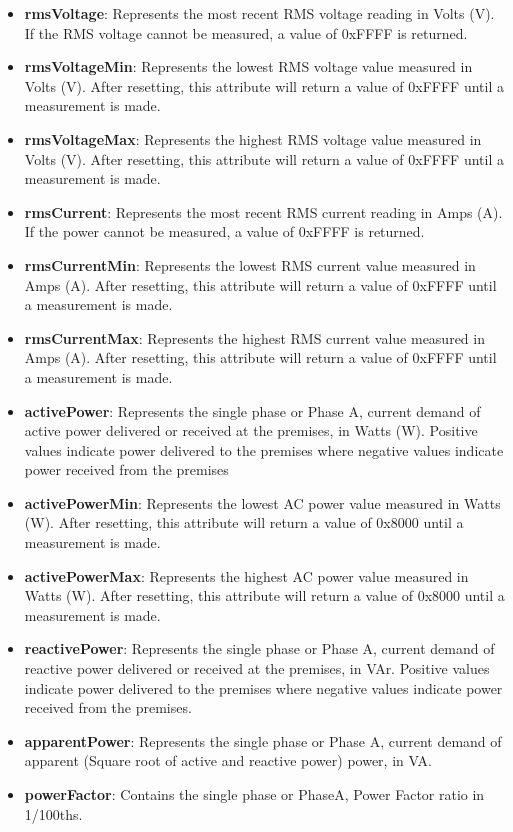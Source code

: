 \begin{itemize}
\item \textbf{rmsVoltage}: Represents the most recent RMS voltage reading in Volts (V). If the RMS voltage cannot be measured, a value of 0xFFFF is returned.
\item \textbf{rmsVoltageMin}: Represents the lowest RMS voltage value measured in Volts (V). After resetting, this attribute will return a value of 0xFFFF until a measurement is made.
\item \textbf{rmsVoltageMax}: Represents the highest RMS voltage value measured in Volts (V). After resetting, this attribute will return a value of 0xFFFF until a measurement is made.
\item \textbf{rmsCurrent}: Represents the most recent RMS current reading in Amps (A). If the power cannot be measured, a value of 0xFFFF is returned.
\item \textbf{rmsCurrentMin}: Represents the lowest RMS current value measured in Amps (A). After resetting, this attribute will return a value of 0xFFFF until a measurement is made.
\item \textbf{rmsCurrentMax}: Represents the highest RMS current value measured in Amps (A). After resetting, this attribute will return a value of 0xFFFF until a measurement is made.
\item \textbf{activePower}: Represents the single phase or Phase A, current demand of active power delivered or received at the premises, in Watts (W). Positive values indicate power delivered to the premises where negative values indicate power received from the premises
\item \textbf{activePowerMin}: Represents the lowest AC power value measured in Watts (W). After resetting, this attribute will return a value of 0x8000 until a measurement is made.
\item \textbf{activePowerMax}: Represents the highest AC power value measured in Watts (W). After resetting, this attribute will return a value of 0x8000 until a measurement is made.
\item \textbf{reactivePower}: Represents the single phase or Phase A, current demand of reactive power delivered or received at the premises, in VAr. Positive values indicate power delivered to the premises where negative values indicate power received from the premises.
\item \textbf{apparentPower}: Represents the single phase or Phase A, current demand of apparent (Square root of active and reactive power) power, in VA.
\item \textbf{powerFactor}: Contains the single phase or PhaseA, Power Factor ratio in 1/100ths.

\end{itemize}
